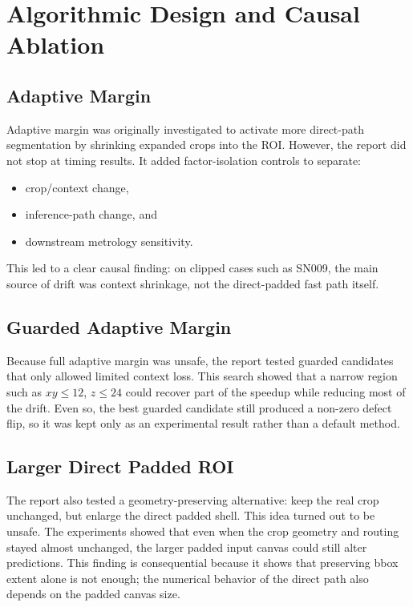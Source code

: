 \hypertarget{algorithmic-design-and-causal-ablation}{%
\section{Algorithmic Design and Causal
Ablation}\label{algorithmic-design-and-causal-ablation}}

\hypertarget{adaptive-margin}{%
\subsection{Adaptive Margin}\label{adaptive-margin}}

Adaptive margin was originally investigated to activate more direct-path
segmentation by shrinking expanded crops into the ROI. However, the
report did not stop at timing results. It added factor-isolation
controls to separate:

\begin{itemize}
\tightlist
\item
  crop/context change,
\item
  inference-path change, and
\item
  downstream metrology sensitivity.
\end{itemize}

This led to a clear causal finding: on clipped cases such as
SN009, the main source of drift was context shrinkage, not the
direct-padded fast path itself.

\hypertarget{guarded-adaptive-margin}{%
\subsection{Guarded Adaptive Margin}\label{guarded-adaptive-margin}}

Because full adaptive margin was unsafe, the report tested guarded
candidates that only allowed limited context loss. This search showed
that a narrow region such as $xy \leq 12$,
$z \leq 24$ could recover part of the speedup while
reducing most of the drift. Even so, the best guarded candidate still
produced a non-zero defect flip, so it was kept only as an experimental
result rather than a default method.

\hypertarget{larger-direct-padded-roi}{%
\subsection{Larger Direct Padded ROI}\label{larger-direct-padded-roi}}

The report also tested a geometry-preserving alternative: keep the real
crop unchanged, but enlarge the direct padded shell. This idea turned
out to be unsafe. The experiments showed that even when the crop
geometry and routing stayed almost unchanged, the larger padded input
canvas could still alter predictions. This finding is consequential because
it shows that preserving bbox extent alone is not enough; the numerical
behavior of the direct path also depends on the padded canvas size.

